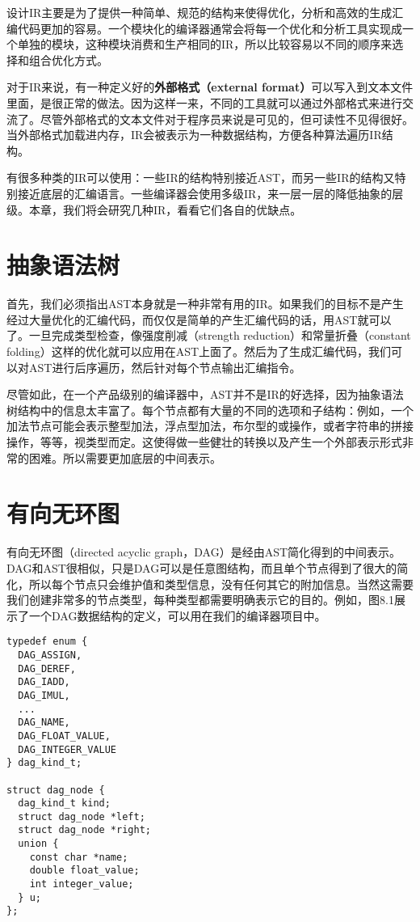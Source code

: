 \documentclass[cn,11pt,chinese]{elegantbook}
\begin{document}
设计IR主要是为了提供一种简单、规范的结构来使得优化，分析和高效的生成汇编代码更加的容易。一个模块化的编译器通常会将每一个优化和分析工具实现成一个单独的模块，这种模块消费和生产相同的IR，所以比较容易以不同的顺序来选择和组合优化方式。

对于IR来说，有一种定义好的\textbf{外部格式（external format）}可以写入到文本文件里面，是很正常的做法。因为这样一来，不同的工具就可以通过外部格式来进行交流了。尽管外部格式的文本文件对于程序员来说是可见的，但可读性不见得很好。当外部格式加载进内存，IR会被表示为一种数据结构，方便各种算法遍历IR结构。

有很多种类的IR可以使用：一些IR的结构特别接近AST，而另一些IR的结构又特别接近底层的汇编语言。一些编译器会使用多级IR，来一层一层的降低抽象的层级。本章，我们将会研究几种IR，看看它们各自的优缺点。

\section{抽象语法树}

首先，我们必须指出AST本身就是一种非常有用的IR。如果我们的目标不是产生经过大量优化的汇编代码，而仅仅是简单的产生汇编代码的话，用AST就可以了。一旦完成类型检查，像强度削减（strength reduction）和常量折叠（constant folding）这样的优化就可以应用在AST上面了。然后为了生成汇编代码，我们可以对AST进行后序遍历，然后针对每个节点输出汇编指令。

尽管如此，在一个产品级别的编译器中，AST并不是IR的好选择，因为抽象语法树结构中的信息太丰富了。每个节点都有大量的不同的选项和子结构：例如，一个加法节点可能会表示整型加法，浮点型加法，布尔型的或操作，或者字符串的拼接操作，等等，视类型而定。这使得做一些健壮的转换以及产生一个外部表示形式非常的困难。所以需要更加底层的中间表示。

\section{有向无环图}

有向无环图（directed acyclic graph，DAG）是经由AST简化得到的中间表示。DAG和AST很相似，只是DAG可以是任意图结构，而且单个节点得到了很大的简化，所以每个节点只会维护值和类型信息，没有任何其它的附加信息。当然这需要我们创建非常多的节点类型，每种类型都需要明确表示它的目的。例如，图8.1展示了一个DAG数据结构的定义，可以用在我们的编译器项目中。

\begin{verbatim}
typedef enum {
  DAG_ASSIGN,
  DAG_DEREF,
  DAG_IADD,
  DAG_IMUL,
  ...
  DAG_NAME,
  DAG_FLOAT_VALUE,
  DAG_INTEGER_VALUE
} dag_kind_t;

struct dag_node {
  dag_kind_t kind;
  struct dag_node *left;
  struct dag_node *right;
  union {
    const char *name;
    double float_value;
    int integer_value;
  } u;
};
\end{verbatim}
\end{document}

